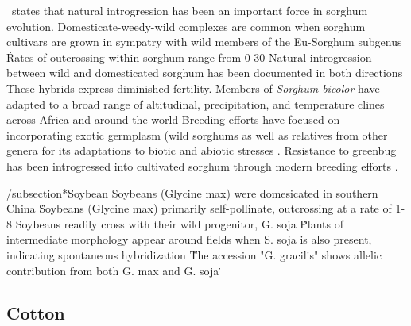 \documentclass[11pt]{article}
\begin{document}
\cite{po1982sorghum}\ states that natural introgression has been an important force in sorghum evolution.
Domesticate-weedy-wild complexes are common when sorghum cultivars are grown in sympatry with wild members of the Eu-Sorghum subgenus \cite{de1978systematics, doggett1968disruptive, baker1972human}\.
Rates of outcrossing within sorghum range from 0-30%
Natural introgression between wild and domesticated sorghum has been documented in both directions \cite{kuhlman2006interspecific, aldrich1992restriction, aldrich1992patterns, doggett1988sorghum, baker1972migrations}\.
These hybrids express diminished fertility.
Members of \emph{Sorghum bicolor} have adapted to a broad range of altitudinal, precipitation, and temperature clines across Africa and around the world \cite{po1982sorghum, CWR}\.
Breeding efforts have focused on incorporating exotic germplasm (wild sorghums as well as relatives from other genera \cite{de1976cytogenetics} for its adaptations to biotic and abiotic stresses \cite{reddy2006current, po1982sorghum, johnson1979breeding}.
Resistance to greenbug has been introgressed into cultivated sorghum through modern breeding efforts \cite{johnson1979breeding}.















/subsection*{Soybean}
Soybeans (Glycine max) were domesicated in southern China \cite{guo2010single}\.
Soybeans (Glycine max) primarily self-pollinate, outcrossing at a rate of 1-8%
Soybeans readily cross with their wild progenitor, G. soja \cite{singh1988genomic}\.
Plants of intermediate morphology appear around fields when S. soja is also present, indicating spontaneous hybridization \cite{kwon1972studies}\.
The accession "G. gracilis" shows allelic contribution from both G. max and G. soja \cite{keim1989restriction}\.














\subsection*{Cotton}
\end{document}
